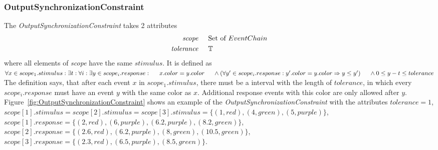 	\subsubsection{OutputSynchronizationConstraint}
		The \emph{OutputSynchronizationConstraint} takes 2 attributes
		\begin{align*}
			\emph{scope} 	& \hspace{.5cm} \text{Set of }EventChain\\
			\emph{tolerance}	& \hspace{.5cm} \mathbb{T}
		\end{align*}
		where all elements of \emph{scope} have the same $stimulus$. It is defined as \\[10pt]
		\begin{math}
			\forall x\in scope_1.stimulus: \exists t: \forall i: \exists y\in scope_i.response:\\
			\text{\hspace{.5cm}} x.color = y.color\\
			\text{\hspace{.5cm}}\land (\forall y'\in scope_i.response: y'.color=y.color \Rightarrow y\leq y')\\
			\text{\hspace{.5cm}}\land 0\leq y-t\leq tolerance
		\end{math}\\[10pt]
		The definition says, that after each event $x$ in $scope_1.stimulus$, there must be a interval with the length of $tolerance$, in which every $scope_i.response$ must have an event $y$ with the same color as $x$. Additional response events with this color are only allowed after $y$.
		Figure~\ref{fig:OutputSynchronizationConstraint} shows an example of the \emph{OutputSynchronizationConstraint} with the attributes $tolerance = 1$,\\
		 $scope[1].stimulus=scope[2].stimulus=scope[3].stimulus=\{(1, red), (4, green), (5, purple)\}$,\\
		$scope[1].response=\{(2, red), (6, purple), (6.2, purple), (8.2, green)\}$,\\
		$scope[2].response=\{(2.6, red), (6.2, purple), (8, green), (10.5, green)\}$,\\
		$scope[3].response=\{(2.3, red), (6.5, purple), (8.5, green)\}$.\\
		
